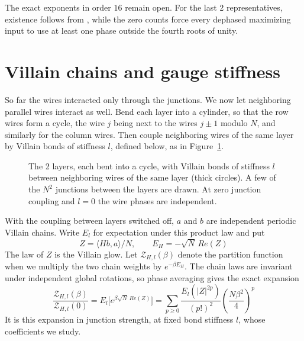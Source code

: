 \documentclass[11pt,a4paper]{article}
\theoremstyle{remark}
\begin{document}
The exact exponents in order $16$ remain open. For the last 2
representatives, existence follows from \cite{iwo}, while the zero
counts force every dephased maximizing input to use at least one phase
outside the fourth roots of unity.

\section{Villain chains and gauge stiffness}\label{sec:villain}

So far the wires interacted only through the junctions. We now let neighboring parallel wires interact as well. Bend each layer into a cylinder, so that the row wires form a cycle, the wire $j$ being next to the wires $j\pm1$ modulo $N$, and similarly for the column wires. Then couple neighboring wires of the same layer by Villain bonds of stiffness $l$, defined below, as in Figure~\ref{fig:rings}.

\begin{figure}[H]
\centering
{}
\caption{The 2 layers, each bent into a cycle, with Villain bonds of stiffness $l$ between neighboring wires of the same layer (thick circles). A few of the $N^2$ junctions between the layers are drawn. At zero junction coupling and $l=0$ the wire phases are independent.}\label{fig:rings}
\end{figure}

With the coupling between layers switched off, $a$ and $b$ are independent periodic Villain chains. Write $E_l$ for expectation under this product law and put
\[
 Z=\langle Hb,a\rangle/N,\qquad E_H=-\sqrt N\,Re(Z)
\]
The law of $Z$ is the Villain glow. Let $\mathcal Z_{H,l}(\beta)$ denote the partition function when we multiply the two chain weights by $e^{-\beta E_H}$. The chain laws are invariant under independent global rotations, so phase averaging gives the exact expansion
\[
 \frac{\mathcal Z_{H,l}(\beta)}{\mathcal Z_{H,l}(0)}
 =E_l\big[e^{\beta\sqrt N\,Re(Z)}\big]
 =\sum_{p\ge0}\frac{E_l(|Z|^{2p})}{(p!)^2}
             \left(\frac{N\beta^2}{4}\right)^p
\]
It is this expansion in junction strength, at fixed bond stiffness $l$, whose coefficients we study.
\end{document}
